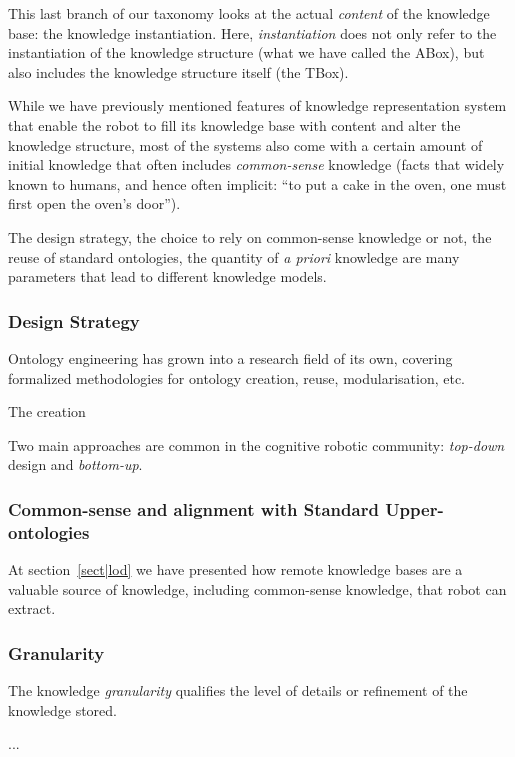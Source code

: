 This last branch of our taxonomy looks at the actual \emph{content} of the
knowledge base: the knowledge instantiation. Here, \emph{instantiation} does
not only refer to the instantiation of the knowledge structure (what we have
called the ABox), but also includes the knowledge structure itself (the TBox).

While we have previously mentioned features of knowledge representation system
that enable the robot to fill its knowledge base with content and alter the
knowledge structure, most of the systems also come with a certain amount of
initial knowledge that often includes \emph{common-sense} knowledge (\ie facts
that widely known to humans, and hence often implicit: ``to put a cake in the
oven, one must first open the oven's door'').

The design strategy, the choice to rely on common-sense knowledge or not, the
reuse of standard ontologies, the quantity of {\it a priori} knowledge are many
parameters that lead to different knowledge models.

\subsubsection{Design Strategy}

Ontology engineering has grown into a research field of its own, covering
formalized methodologies for ontology creation, reuse, modularisation, etc.

The creation

Two main approaches are common in the cognitive robotic community:
\emph{top-down} design and \emph{bottom-up}.

\subsubsection{Common-sense and alignment with Standard Upper-ontologies}

At section~\ref{sect|lod} we have presented how remote knowledge bases are a
valuable source of knowledge, including common-sense knowledge, that robot can
extract.

\subsubsection{Granularity}

The knowledge \emph{granularity} qualifies the level of details or refinement
of the knowledge stored.

...

